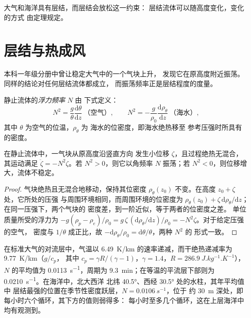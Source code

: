 大气和海洋具有层结，而层结会放松这一约束：
层结流体可以随高度变化，变化的方式
由定理规定。

\section{层结与热成风}\label{sec:b3:gfd-foundations:stratification}

本科一年级分册中曾让稳定大气中的一个气块上升，
发现它在原高度附近振荡。同样的结论对任何层结流体都成立，
而振荡频率正是层结程度的度量。

\begin{definition}[浮力频率]\label{def:b3:gfd-foundations:buoyancy}
静止流体的\emph{浮力频率} $N$ 由
下式定义：
\[
N^2 = \frac{g}{\theta}\frac{\mathrm d\theta}{\mathrm dz}\ \text{（空气）},
\qquad
N^2 = -\frac{g}{\rho_0}\frac{\mathrm d\rho_\theta}{\mathrm dz}\ \text{（海水）},
\]
其中 $\theta$ 为空气的位温，$\rho_\theta$ 为
海水的位密度，即海水绝热移至
参考压强时所具有的密度。
\end{definition}

\begin{theorem}[位移气块的振荡]\label{thm:b3:gfd-foundations:buoyancy}
在静止流体中，一气块从原高度沿竖直方向
发生小位移 $\zeta$，且过程绝热无混合，其运动满足 $\ddot\zeta =
-N^2\zeta$。若 $N^2 > 0$，则它以角频率 $N$ 振荡；若
$N^2 < 0$，则位移增大，流体不稳定。
\end{theorem}

\begin{proof}
气块绝热且无混合地移动，保持其位密度
$\rho_\theta(z_0)$ 不变。在高度 $z_0 + \zeta$ 处，它所处的压强
与周围环境相同，而周围环境的位密度为 $\rho_\theta(z_0) +
\zeta\,\mathrm d\rho_\theta/\mathrm dz$；在同一压强下，两个气块的
密度差，到一阶近似，等于两者的位密度之差。
单位质量所受的浮力为 $-g(\rho_p - \rho_e)/\rho_0 =
g\,\zeta\,(\mathrm d\rho_\theta/\mathrm dz)/\rho_0 = -N^2\zeta$。对于给定压强的空气，
密度与 $1/\theta$ 成正比，故 $-\mathrm
d\rho_\theta/\rho_0 = \mathrm d\theta/\theta$，两种 $N^2$ 的
形式一致。
\end{proof}

在标准大气的对流层中，气温以
\qty{6.49}{K/km} 的速率递减，而干绝热递减率为 \qty{9.77}{K/km}（$g/c_p$，
其中 $c_p = \gamma R/(\gamma - 1)$，$\gamma = 1.4$，$R =
\qty{286.9}{J.kg^{-1}.K^{-1}}$），$N$ 的平均值为 \qty{0.0113}{s^{-1}}，周期为
\qty{9.3}{min}；在等温的平流层下部则为
\qty{0.0210}{s^{-1}}。在海洋中，北大西洋
北纬 \ang{40.5}、西经 \ang{30.5} 处的水柱，其年平均值中
层结最强的位置在季节性密度跃层，$N = \qty{0.0106}{s^{-1}}$，位于
约 \qty{30}{m} 深处，即每小时六个循环，其下方的值则弱得多：
每小时至多几个循环，这在上层海洋中均有观测到。

